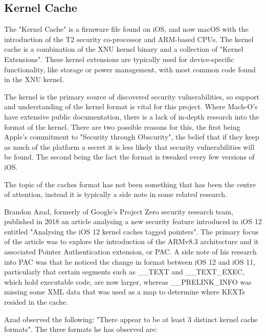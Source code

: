 \subsection{Kernel Cache}


The "Kernel Cache" is a firmware file found on iOS, and now macOS with the introduction of the T2 security co-processor and ARM-based CPUs. The kernel cache is a combination of the XNU kernel binary and a collection of "Kernel Extensions". These kernel extensions are typically used for device-specific functionality, like storage or power management, with most common code found in the XNU kernel.



The kernel is the primary source of discovered security vulnerabilities, so support and understanding of the kernel format is vital for this project. Where Mach-O's have extensive public documentation, there is a lack of in-depth research into the format of the kernel. There are two possible reasons for this, the first being Apple's commitment to "Security through Obscurity"\cite{security-through-obscurity}, the belief that if they keep as much of the platform a secret it is less likely that security vulnerabilities will be found. The second being the fact the format is tweaked every few versions of iOS.

The topic of the caches format has not been something that has been the centre of attention, instead it is typically a side note in some related research.



Brandon Azad, formerly of Google's Project Zero security research team, published in 2018 an article analysing a new security feature introduced in iOS 12 entitled "Analysing the iOS 12 kernel caches tagged pointers"\cite{azad-tagged-pointers}. The primary focus of the article was to explore the introduction of the ARMv8.3 architecture and it associated Pointer Authentication\cite{rutland-pac-slides} extension, or PAC. A side note of his research into PAC was that he noticed the change in format between iOS 12 and iOS 11, particularly that certain segments such as \_\_TEXT and \_\_TEXT\_EXEC, which hold executable code, are now larger, whereas \_\_PRELINK\_INFO was missing some XML data that was used as a map to determine where KEXTs resided in the cache. 

Azad observed the following: "There appear to be at least 3 distinct kernel cache formats". The three formats he has observed are:


